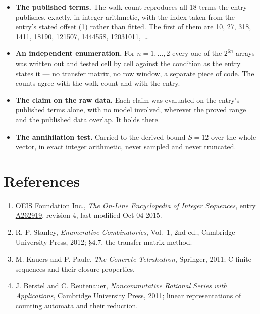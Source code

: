 \documentclass[11pt]{article}
\theoremstyle{definition}
\begin{document}
\begin{itemize}

\item {\bfseries The published terms.} The walk count reproduces all 18 terms the entry publishes, exactly, in integer arithmetic, with the index taken from the entry's stated offset (1) rather than fitted. The first of them are 10, 27, 318, 1411, 18190, 121507, 1444558, 12031011,~\dots

\item {\bfseries An independent enumeration.} For $n = 1,\dots,2$ every one of the $2^{6n}$ arrays was written out and tested cell by cell against the condition as the entry states it --- no transfer matrix, no row window, a separate piece of code. The counts agree with the walk count and with the entry.

\item {\bfseries The claim on the raw data.} Each claim was evaluated on the entry's published terms alone, with no model involved, wherever the proved range and the published data overlap. It holds there.

\item {\bfseries The annihilation test.} Carried to the derived bound $S = 12$ over the whole vector, in exact integer arithmetic, never sampled and never truncated.

\end{itemize}

\section{References}

\begin{enumerate}

\item OEIS Foundation Inc., \emph{The On-Line Encyclopedia of Integer Sequences}, entry \href{https://oeis.org/A262919}{A262919}, revision 4, last modified Oct 04 2015.

\item R. P. Stanley, \emph{Enumerative Combinatorics}, Vol.~1, 2nd ed., Cambridge University Press, 2012; \S4.7, the transfer-matrix method.

\item M. Kauers and P. Paule, \emph{The Concrete Tetrahedron}, Springer, 2011; C-finite sequences and their closure properties.

\item J. Berstel and C. Reutenauer, \emph{Noncommutative Rational Series with Applications}, Cambridge University Press, 2011; linear representations of counting automata and their reduction.

\end{enumerate}
\end{document}
